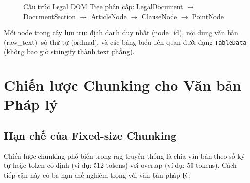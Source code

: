 \begin{figure}[H]
    \centering
    \caption{Cấu trúc Legal DOM Tree phân cấp: LegalDocument $\rightarrow$ DocumentSection $\rightarrow$ ArticleNode $\rightarrow$ ClauseNode $\rightarrow$ PointNode}
    \label{fig:legal_dom_tree}
\end{figure}

Mỗi node trong cây lưu trữ: định danh duy nhất (node\_id), nội dung văn bản (raw\_text), số thứ tự (ordinal), và các bảng biểu liên quan dưới dạng \texttt{TableData} (không bao giờ stringify thành text phẳng).

\section{Chiến lược Chunking cho Văn bản Pháp lý}

\subsection{Hạn chế của Fixed-size Chunking}

Chiến lược chunking phổ biến trong \gls{rag} truyền thống là chia văn bản theo số ký tự hoặc token cố định (ví dụ: 512 tokens) với overlap (ví dụ: 50 tokens). Cách tiếp cận này có ba hạn chế nghiêm trọng với văn bản pháp lý:

